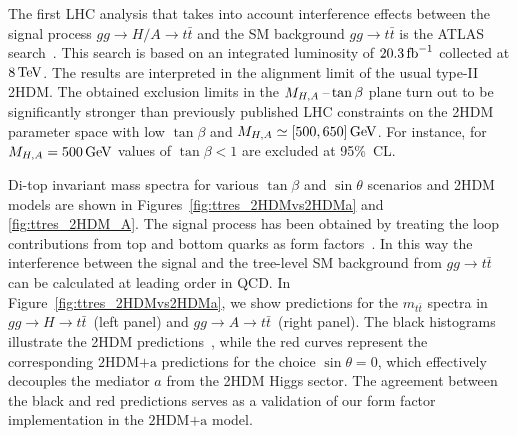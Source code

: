 \documentclass[a4paper, 11pt,notoc]{article}
\newcommand{\hdma}{\ensuremath{\textrm{2HDM+a}}\xspace}
\begin{document}
The first LHC analysis that takes into account interference effects between the signal process $gg \to H/A \to t \bar t$ and the SM background $gg \to t \bar t$ is the ATLAS search~\cite{Aaboud:2017hnm}. This search  is based on an integrated luminosity of $20.3 \, {\rm fb}^{-1}$ collected at $8 \, {\rm TeV}$. The results are interpreted in the alignment limit of the usual type-II 2HDM. The obtained  exclusion limits in the $M_{H,A}\hspace{0.5mm}$--$\hspace{0.5mm} \tan \beta$ plane turn out to be significantly stronger than previously published LHC constraints on the 2HDM parameter space with low $\tan \beta$ and $M_{H,A} \simeq [500, 650] \, {\rm GeV}$. For instance,  for $M_{H,A} = 500 \, {\rm GeV}$ values of $\tan \beta < 1$ are excluded at 95\%~CL. %

Di-top invariant mass spectra for various $\tan \beta$ and $\sin \theta$ scenarios and 2HDM models are shown in Figures~\ref{fig:ttres_2HDMvs2HDMa} and \ref{fig:ttres_2HDM_A}. The signal process has been obtained by treating the loop contributions from top and bottom quarks as form factors~\cite{FranzosiZhang}. In this way the interference between the signal and the tree-level SM background from $gg \to t \bar t$ can be calculated at leading order in QCD. In Figure~\ref{fig:ttres_2HDMvs2HDMa}, we show predictions for the $m_{t \bar t}$ spectra in $gg \to H \to t \bar t$~(left panel) and $gg \to A \to t \bar t$~(right panel). The black histograms illustrate the 2HDM predictions~\cite{Aaboud:2017hnm}, while the red curves represent the corresponding \hdma predictions for the choice $\sin \theta = 0$, which effectively decouples the mediator $a$ from the 2HDM Higgs sector. The agreement between the black and red predictions serves as a validation of our form factor implementation in the \hdma model. 
\end{document}
